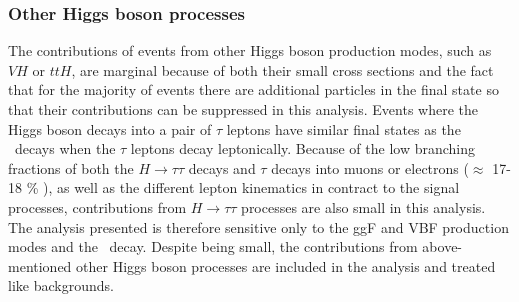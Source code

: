 \subsubsection{Other Higgs boson processes}
The contributions of \HWW events from other Higgs boson production modes, such as $VH$ or $ttH$, are marginal because of both their small cross sections and the fact that for the majority of events there are additional particles in the final state so that their contributions can be suppressed in this analysis.
Events where the Higgs boson decays into a pair of $\tau$ leptons have similar final states as the \HWWdet\ decays when the $\tau$ leptons decay leptonically. 
Because of the low branching fractions of both the $H \to \tau\tau$ decays and $\tau$ decays into muons or electrons ($\approx$ 17-18 \% \cite{PDG2020}), as well as the different lepton kinematics in contract to the signal processes, contributions from $H \to \tau\tau$ processes are also small in this analysis. 
The analysis presented is therefore sensitive only to the ggF and VBF production modes and the \HWWdet\ decay. 
Despite being small, the contributions from above-mentioned other Higgs boson processes are included in the analysis and treated like backgrounds.

